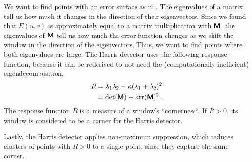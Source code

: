 We want to find points with an error surface as in
. The eigenvalues of a matrix tell us how much
it changes in the direction of their eigenvectors. Since we found that $E(u,v)$
is approximately equal to a matrix multiplication with $\bm{\mathsf{M}}$, the
eigenvalues of $\bm{\mathsf{M}}$ tell us how much the error function changes as we
shift the window in the direction of the eigenvectors. Thus, we want to find
points where both eigenvalues are large. The Harris detector uses the following
response function, because it can be rederived to not need the (computationally
inefficient) eigendecomposition,
\begin{align*}
  R &= \lambda_1\lambda_2 - \kappa (\lambda_1+\lambda_2)^2 \\
  &= \det{\tens{M}}-\kappa \tr{\tens{M}}^2
.\end{align*}
The response function $R$ is a measure of a window's ``cornerness``. If
$R>0$, its window is considered to be a corner for the Harris detector.

Lastly, the Harris detector applies non-maximum suppression, which reduces
clusters of points with $R>0$ to a single point, since they capture the same
corner.

